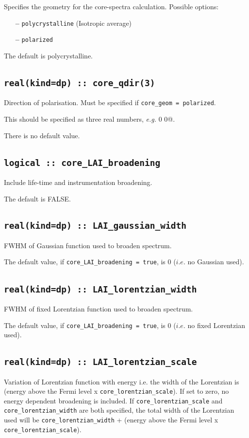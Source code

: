 \documentclass[a4paper,11pt,twoside]{book}
\begin{document}
{Specifies the geometry for the core-spectra calculation.  Possible options: 
\begin{itemize}
\item[{\bf --}]  \verb#polycrystalline# (Isotropic average)
\item[{\bf --}]  \verb#polarized#  
\end{itemize}
The default is polycrystalline.

\subsection[core\_qdir]{\tt real(kind=dp) :: core\_qdir(3)}
Direction of polarisation. Must be specified if \verb#core_geom = polarized#.

This should be specified as three real numbers, \emph{e.g.}  0 0@.

There is no default value.

\subsection[core\_LAI\_broadening]{\tt logical :: core\_LAI\_broadening}
Include life-time and instrumentation broadening.  

The default is FALSE.

\subsection[core\_gaussian\_width]{\tt real(kind=dp) :: LAI\_gaussian\_width}
FWHM of Gaussian function used to broaden spectrum.  

The default value, if \verb#core_LAI_broadening = true#, is 0 ($i.e.$ no Gaussian used).

\subsection[core\_lorentzian\_width]{\tt real(kind=dp) :: LAI\_lorentzian\_width}
FWHM of fixed Lorentzian function used to broaden spectrum.  

The default value, if \verb#core_LAI_broadening = true#, is 0 ($i.e.$ no fixed Lorentzian used).

\subsection[core\_lorentzian\_scale]{\tt real(kind=dp) :: LAI\_lorentzian\_scale}
Variation of Lorentzian function with energy i.e. the width of the Lorentzian is (energy above the Fermi level x 
\verb#core_lorentzian_scale#).  If set to zero, no energy dependent broadening is included.  
If \verb#core_lorentzian_scale# and \verb#core_lorentzian_width# are both specified, the 
total width of the Lorentzian used will be \verb#core_lorentzian_width# + (energy above the Fermi level x 
\verb#core_lorentzian_scale#).

}
\end{document}
